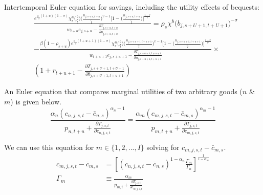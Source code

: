 \documentclass[letterpaper,12pt]{article}
\theoremstyle{definition}
\begin{document}
\begin{spacing}{1.5}
    Intertemporal Euler equation for savings, including the utility effects of bequests:
    \begin{equation}\label{EqbEuler}
      \begin{split}
      & \frac{ e^{g_y (t+u)(1-\sigma)}\chi^n_{s}\biggl(\frac{b}{\tilde{l}}\biggr)\biggl(\frac{n_{j,s+u,t+u}}{\tilde{l}}\biggr)^{v-1}\Biggl[1 - \biggl(\frac{n_{j,s+u,t+u}}{\tilde{l}}\biggr)\Biggr]^{\frac{1-v}{v}} } { w_{t+u} e_{j,s+u} - \frac{\partial T_{j,s+u,t+u}}{\partial n_{j,s+u,t+u}} } = \rho_s\chi^b\bigl(b_{j,s+U+1,t+U+1}\bigr)^{-\sigma}\\ 
      &  - \frac{ \beta(1-\rho_{s+u}) e^{g_y (t+u+1)(1-\sigma)}\chi^n_{s}\biggl(\frac{b}{\tilde{l}}\biggr)\biggl(\frac{n_{j,s+u+1,t+u+1}}{\tilde{l}}\biggr)^{v-1}\Biggl[1 - \biggl(\frac{n_{j,s+u+1,t+u+1}}{\tilde{l}}\biggr)\Biggr]^{\frac{1-v}{v}} } { w_{t+u+1} e_{j,s+u+1} - \frac{\partial T_{j,s+u+1,t+u+1}}{\partial n_{j,s+u+1,t+u+1}} } \times \\
      & \left( 1 + r_{t+u+1} - \frac{\partial T_{j,s+U+1,t+U+1}}{\partial b_{j,s+U+1,t+u+1}} \right)
      \end{split}
    \end{equation}



    An Euler equation that compares marginal utilities of two arbitrary goods ($n$ \& $m$) is given below.
    \begin{equation}\label{EqcEuler2}
      \frac{ \alpha_n \left( c_{n,j,s,t} - \bar c_{n,s} \right)^{\alpha_n-1} } { p_{n,t+u} + \frac{\partial T_{j,s,t}}{\partial c_{n,j,s,t}} } = \frac{ \alpha_m \left( c_{m,j,s,t} - \bar c_{m,s} \right)^{\alpha_m-1} } { p_{m,t+u} + \frac{\partial T_{j,s,t}}{\partial c_{m,j,s,t}} }
    \end{equation}

    We can use this equation for $m \in \{1,2,...,I\}$ solving for $c_{m,j,s,t} - \bar c_{m,s}$.
    \begin{align}
        c_{m,j,s,t} - \bar c_{m,s} & = \left[ \left(c_{n,j,s,t} - \bar c_{n,s} \right)^{1-\alpha_n} \frac{\Gamma_m}{\Gamma_n} \right]^{\frac{1}{1-\alpha_m}}  \label{Eqcmdef} \\
        \Gamma_m & \equiv \frac{ \alpha_m } { p_{m,t} + \frac{\partial T_{j,s,t}}{\partial c_{m,j,s,t}} } \nonumber
    \end{align}


\end{spacing}
\end{document}

